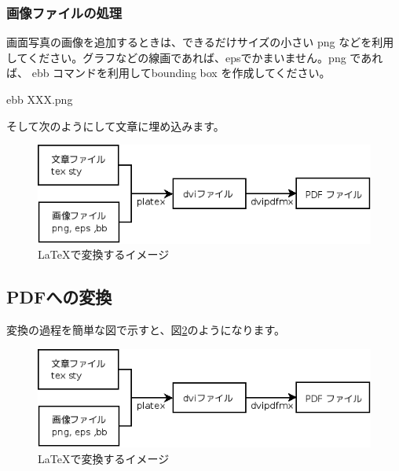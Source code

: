\documentclass[mingoth,a4paper]{jsarticle}
\begin{document}
\subsubsection{画像ファイルの処理}

画面写真の画像を追加するときは、できるだけサイズの小さい png などを利用
してください。グラフなどの線画であれば、epsでかまいません。png であれば、 
ebb コマンドを利用してbounding box を作成してください。

\begin{commandline}
 ebb XXX.png
\end{commandline}

そして次のようにして文章に埋め込みます。

\begin{commandline}
\begin{figure}[!htbp]
\begin{center}
 \includegraphics[width=120mm]{image200802/latex.png}
 \caption{\LaTeX で変換するイメージ}
 \label{fig:latex}
\end{center}
\end{figure}
\end{commandline}

\subsection{PDFへの変換}

変換の過程を簡単な図で示すと、図\ref{fig:latex}のようになります。

\begin{figure}[!htbp]
\begin{center}
 \includegraphics[width=120mm]{image200802/latex.png}
 \caption{\LaTeX で変換するイメージ}
 \label{fig:latex}
\end{center}
\end{figure}
\end{document}
